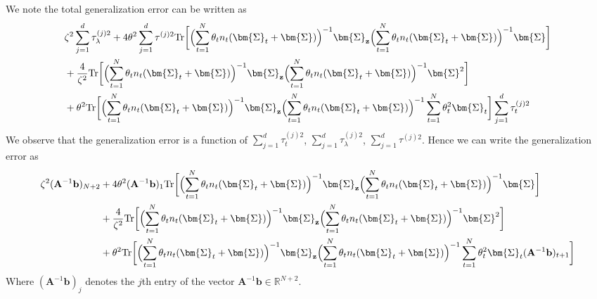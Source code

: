 \documentclass[final]{l4dc2026}
\newcommand{\bSigma}{\bm{\Sigma}}
\newcommand{\bA}{\mathbf{A}}
\newcommand{\bb}{\mathbf{b}}
\newcommand{\be}{\mathbf{e}}
\newcommand{\bh}{\mathbf{h}}
\newcommand{\bz}{\mathbf{z}}
\newcommand{\bbR}{\mathbb{R}}
\newcommand{\tr}{\text{Tr}}
\begin{document}

We note the total generalization error can be written as
\begin{align*}
    &\zeta^2 \sum_{j=1}^d  \tau_{\lambda}^{(j)2} + 4\theta^2 \sum_{j=1}^d \tau^{(j)2} \tr \biggl[ \Bigl(\sum_{t=1}^N \theta_t n_t (\bSigma_t + \bSigma) \Bigr)^{-1} \bSigma_{\bz}  \Bigl(\sum_{t=1}^N \theta_t n_t (\bSigma_t + \bSigma) \Bigr)^{-1} \bSigma \biggr] \\
    &+ \frac{4}{\zeta^2} \tr \biggl[ \Bigl(\sum_{t=1}^N \theta_t n_t (\bSigma_t + \bSigma) \Bigr)^{-1} \bSigma_{\bz}  \Bigl(\sum_{t=1}^N \theta_t n_t (\bSigma_t + \bSigma) \Bigr)^{-1} \bSigma^2 \biggr]\\
    &+ \theta^2  \tr \biggl[ \Bigl(\sum_{t=1}^N \theta_t n_t (\bSigma_t + \bSigma) \Bigr)^{-1} \bSigma_{\bz}  \Bigl(\sum_{t=1}^N \theta_t n_t (\bSigma_t + \bSigma) \Bigr)^{-1}  \sum_{t=1}^N \theta^2_t \bSigma_t \biggr] \sum_{j=1}^d \tau^{(j)2}_t 
\end{align*}
We observe that the generalization error is a function of $\sum_{j=1}^d \tau^{(j)2}_t$, $\sum_{j=1}^d  \tau_{\lambda}^{(j)2}$, $ \sum_{j=1}^d \tau^{(j)2}$. Hence we can write the generalization error as
\begin{align*}
    \zeta^2 (\bA^{-1} \bb)_{N+2} &+ 4\theta^2 (\bA^{-1} \bb)_{1} \tr \biggl[ \Bigl(\sum_{t=1}^N \theta_t n_t (\bSigma_t + \bSigma) \Bigr)^{-1} \bSigma_{\bz}  \Bigl(\sum_{t=1}^N \theta_t n_t (\bSigma_t + \bSigma) \Bigr)^{-1} \bSigma \biggr] \\
     &+ \frac{4}{\zeta^2} \tr \biggl[ \Bigl(\sum_{t=1}^N \theta_t n_t (\bSigma_t + \bSigma) \Bigr)^{-1} \bSigma_{\bz}  \Bigl(\sum_{t=1}^N \theta_t n_t (\bSigma_t + \bSigma) \Bigr)^{-1} \bSigma^2 \biggr]\\
     &+ \theta^2  \tr \biggl[  \Bigl(\sum_{t=1}^N \theta_t n_t (\bSigma_t + \bSigma) \Bigr)^{-1} \bSigma_{\bz}  \Bigl(\sum_{t=1}^N \theta_t n_t (\bSigma_t + \bSigma) \Bigr)^{-1}  \sum_{t=1}^N \theta^2_t \bSigma_t (\bA^{-1} \bb)_{t+1} \biggr]  
\end{align*}
Where $(\bA^{-1} \bb)_j$ denotes the $j$th entry of the vector $\bA^{-1} \bb \in \bbR^{N+2}$.
\end{document}
